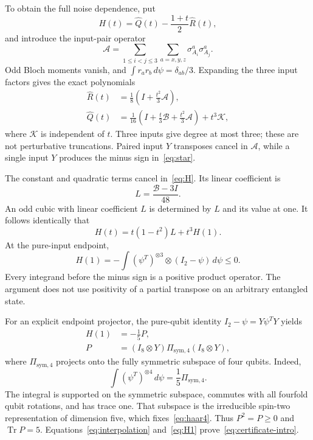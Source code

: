 \documentclass[aps,pra,reprint,amsmath,amssymb,longbibliography,nofootinbib]{revtex4-2}
\newcommand{\Tr}{\operatorname{Tr}}
\newcommand{\cB}{\mathcal B}
\newcommand{\cA}{\mathcal A}
\newcommand{\Qh}{\widehat Q}
\newcommand{\Rh}{\widehat R}
\begin{document}
To obtain the full noise dependence, put
\begin{equation}
 H(t)=\Qh(t)-\frac{1+t}{2}\Rh(t),
 \label{eq:H}
\end{equation}
and introduce the input-pair operator
\begin{equation}
 \cA=\sum_{1\leq i<j\leq3}\sum_{a=x,y,z}
       \sigma^a_{A_i}\sigma^a_{A_j}.
 \label{eq:A}
\end{equation}
Odd Bloch moments vanish, and $\int r_ar_b\,d\psi=\delta_{ab}/3$. Expanding the three input factors gives the exact polynomials
\begin{align}
 \Rh(t)&=\frac18\left(I+\frac{t^2}{3}\cA\right),
 \label{eq:R-expand}\\
 \Qh(t)&=\frac1{16}\left(I+\frac{t}{3}\cB
                    +\frac{t^2}{3}\cA\right)+t^3\mathcal K,
 \label{eq:Q-expand}
\end{align}
where $\mathcal K$ is independent of $t$. Three inputs give degree at most three; these are not perturbative truncations. Paired input $Y$ transposes cancel in $\cA$, while a single input $Y$ produces the minus sign in~\eqref{eq:star}.

The constant and quadratic terms cancel in~\eqref{eq:H}. Its linear coefficient is
\begin{equation}
 L=\frac{\cB-3I}{48}.
 \label{eq:L}
\end{equation}
An odd cubic with linear coefficient $L$ is determined by $L$ and its value at one. It follows identically that
\begin{equation}
 H(t)=t(1-t^2)L+t^3H(1).
 \label{eq:interpolation}
\end{equation}
At the pure-input endpoint,
\begin{equation}
 H(1)=-\int(\psi^T)^{\otimes3}\otimes(I_2-\psi)\,d\psi\leq0.
 \label{eq:endpoint}
\end{equation}
Every integrand before the minus sign is a positive product operator. The argument does not use positivity of a partial transpose on an arbitrary entangled state.

For an explicit endpoint projector, the pure-qubit identity $I_2-\psi=Y\psi^T Y$ yields
\begin{align}
 H(1)&=-\frac15P,
 \label{eq:H1}\\
 P&=(I_8\otimes Y)\Pi_{\mathrm{sym},4}(I_8\otimes Y),
 \label{eq:P}
\end{align}
where $\Pi_{\mathrm{sym},4}$ projects onto the fully symmetric subspace of four qubits. Indeed,
\begin{equation}
 \int(\psi^T)^{\otimes4}\,d\psi=\frac15\Pi_{\mathrm{sym},4}.
 \label{eq:haar4}
\end{equation}
The integral is supported on the symmetric subspace, commutes with all fourfold qubit rotations, and has trace one. That subspace is the irreducible spin-two representation of dimension five, which fixes~\eqref{eq:haar4}. Thus $P^2=P\geq0$ and $\Tr P=5$. Equations~\eqref{eq:interpolation} and~\eqref{eq:H1} prove~\eqref{eq:certificate-intro}.
\end{document}
